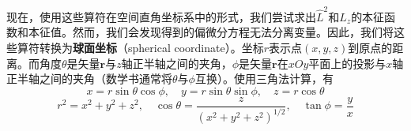     现在，使用这些算符在空间直角坐标系中的形式，我们尝试求出$\hat{L}^2$和$\hat{L}_z$的本征函数和本征值。然而，我们会发现得到的偏微分方程无法分离变量。因此，我们将这些算符转换为\textbf{球面坐标}（spherical coordinate）。坐标$r$表示点$\left(x,y,z\right)$到原点的距离。而角度$\theta$是矢量$\mathbf{r}$与$z$轴正半轴之间的夹角，$\phi$是矢量$\mathbf{r}$在$xOy$平面上的投影与$x$轴正半轴之间的夹角（数学书通常将$\theta$与$\phi$互换）。使用三角法计算，有
    \begin{equation}
        x = r\sin\theta\cos\phi, \quad y = r\sin\theta\sin\phi, \quad z = r\cos\theta
        \label{eq:5.51}
    \end{equation}
    \begin{equation}
        r^2 = x^2 + y^2 + z^2, \quad \cos\theta = \frac{z}{\left(x^2+y^2+z^2\right)^{1/2}}, \quad \tan\phi = \frac{y}{x}
        \label{eq:5.52}
    \end{equation}

